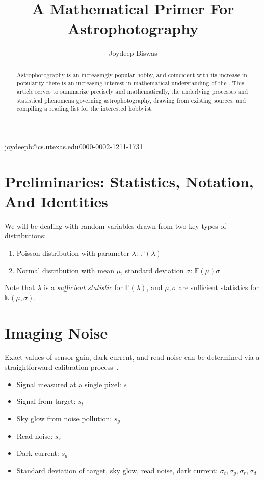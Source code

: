 \documentclass[biblatex]{lni}
\newcommand{\poisson}[1]{\ensuremath{\mathds{P}(#1)}}
\newcommand{\normal}[2]{\ensuremath{\mathds{N}(#1,#2)}}
\newcommand{\E}[1]{\ensuremath{\mathds{E}(#1)}}
\begin{document}
\title{A Mathematical Primer For Astrophotography}
\author[1]{Joydeep Biswas}{joydeepb@cs.utexas.edu}{0000-0002-1211-1731}
\maketitle

\begin{abstract}
Astrophotography is an increasingly popular hobby, and coincident with its increase in popularity there is an increasing interest in mathematical understanding of the . This article serves to summarize precisely and mathematically, the underlying processes and statistical phenomena governing astrophotography, drawing from existing sources, and compiling a reading list for the interested hobbyist.
\end{abstract}


\section{Preliminaries: Statistics, Notation, And Identities}
We will be dealing with random variables drawn from two key types of distributions:
\begin{enumerate}
    \item Poisson distribution with parameter $\lambda$: $\poisson{\lambda}$
    \item Normal distribution with mean $\mu$, standard deviation $\sigma$: $\E{\mu}{\sigma}$
\end{enumerate}
Note that $\lambda$ is a \emph{sufficient statistic} for $\poisson{\lambda}$, and $\mu,\sigma$ are sufficient statistics for $\normal{\mu}{\sigma}$.
\section{Imaging Noise}

Exact values of sensor gain, dark current, and read noise can be determined via a straightforward calibration process~\cite{stark2009signal3}.
\begin{itemize}
    \item Signal measured at a single pixel: $s$
    \item Signal from target: $s_t$
    \item Sky glow from noise pollution: $s_g$
    \item Read noise: $s_r$
    \item Dark current: $s_d$
    \item Standard deviation of target, sky glow, read noise, dark current: $\sigma_t, \sigma_g, \sigma_r, \sigma_d$
\end{itemize}
\end{document}
